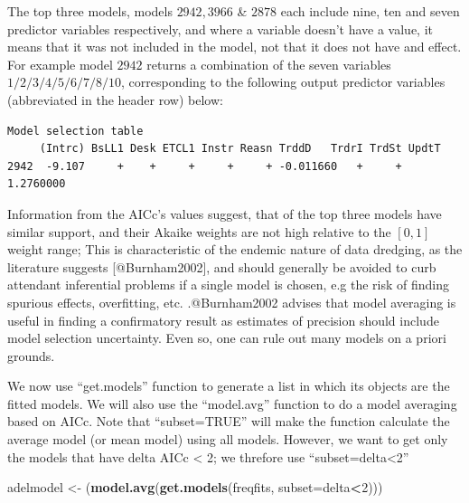 \documentclass[]{article}
\newenvironment{Shaded}{\begin{snugshade}}{\end{snugshade}}
\newcommand{\KeywordTok}[1]{\textcolor[rgb]{0.13,0.29,0.53}{\textbf{#1}}}
\newcommand{\DataTypeTok}[1]{\textcolor[rgb]{0.13,0.29,0.53}{#1}}
\newcommand{\DecValTok}[1]{\textcolor[rgb]{0.00,0.00,0.81}{#1}}
\newcommand{\StringTok}[1]{\textcolor[rgb]{0.31,0.60,0.02}{#1}}
\newcommand{\OperatorTok}[1]{\textcolor[rgb]{0.81,0.36,0.00}{\textbf{#1}}}
\newcommand{\NormalTok}[1]{#1}
\begin{document}
The top three models, models \(2942, 3966\) \& \(2878\) each include
nine, ten and seven predictor variables respectively, and where a
variable doesn't have a value, it means that it was not included in the
model, not that it does not have and effect. For example model \(2942\)
returns a combination of the seven variables \(1/2/3/4/5/6/7/8/10\),
corresponding to the following output predictor variables (abbreviated
in the header row) below:

\singlespacing

\begin{verbatim}
Model selection table 
     (Intrc) BsLL1 Desk ETCL1 Instr Reasn TrddD   TrdrI TrdSt UpdtT 
2942  -9.107     +    +     +     +     + -0.011660   +     + 1.2760000 
\end{verbatim}

\doublespacing

Information from the AICc's values suggest, that of the top three models
have similar support, and their Akaike weights are not high relative to
the \([0,1]\) weight range; This is characteristic of the endemic nature
of data dredging, as the literature suggests {[}@Burnham2002{]}, and
should generally be avoided to curb attendant inferential problems if a
single model is chosen, e.g the risk of finding spurious effects,
overfitting, etc. .@Burnham2002 advises that model averaging is useful
in finding a confirmatory result as estimates of precision should
include model selection uncertainty. Even so, one can rule out many
models on a priori grounds.\medskip    

We now use ``get.models'' function to generate a list in which its
objects are the fitted models. We will also use the ``model.avg''
function to do a model averaging based on AICc. Note that
``subset=TRUE'' will make the function calculate the average model (or
mean model) using all models. However, we want to get only the models
that have delta AICc \textless{} 2; we threfore use
``subset=delta\textless{}2''

\singlespacing

\begin{Shaded}
\begin{Highlighting}[]
\NormalTok{adelmodel <-}\StringTok{ }\NormalTok{(}\KeywordTok{model.avg}\NormalTok{(}\KeywordTok{get.models}\NormalTok{(freqfits, }\DataTypeTok{subset=}\NormalTok{delta}\OperatorTok{<}\DecValTok{2}\NormalTok{)))}
\end{Highlighting}
\end{Shaded}
\end{document}
